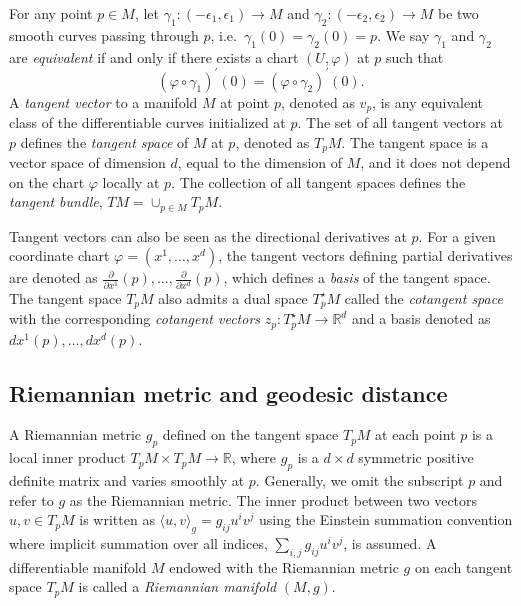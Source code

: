 \documentclass[11pt,a4paper,]{article}
\begin{document}
For any point \(p \in M\), let \(\gamma_1: (-\epsilon_1, \epsilon_1)\rightarrow M\) and \(\gamma_2: (-\epsilon_2, \epsilon_2)\rightarrow M\) be two smooth curves passing through \(p\), i.e.~\(\gamma_1(0) = \gamma_2(0) = p\). We say \(\gamma_1\) and \(\gamma_2\) are \emph{equivalent} if and only if there exists a chart \((U,\varphi)\) at \(p\) such that
\[
(\varphi \circ \gamma_1)^\prime(0) = (\varphi \circ \gamma_2)^\prime(0).
\]
A \emph{tangent vector} to a manifold \(M\) at point \(p\), denoted as \(v_p\), is any equivalent class of the differentiable curves initialized at \(p\). The set of all tangent vectors at \(p\) defines the \emph{tangent space} of \(M\) at \(p\), denoted as \(T_pM\). The tangent space is a vector space of dimension \(d\), equal to the dimension of \(M\), and it does not depend on the chart \(\varphi\) locally at \(p\). The collection of all tangent spaces defines the \emph{tangent bundle}, \(TM = \cup_{p \in M}T_pM\).

Tangent vectors can also be seen as the directional derivatives at \(p\). For a given coordinate chart \(\varphi=(x^1,\dots,x^d)\), the tangent vectors defining partial
derivatives are denoted as \(\frac{\partial}{\partial x^1}(p),\dots,\frac{\partial}{\partial x^d}(p)\), which defines a \emph{basis} of the tangent space.
The tangent space \(T_pM\) also admits a dual space \(T^\star_pM\) called the \emph{cotangent space} with the corresponding \emph{cotangent vectors} \(z_p: T^\star_pM \rightarrow \mathbb{R}^d\) and a basis denoted as \(dx^1(p),\dots,dx^d(p)\).

\hypertarget{riemannian-metric-and-geodesic-distance}{%
\subsection{Riemannian metric and geodesic distance}\label{riemannian-metric-and-geodesic-distance}}

A Riemannian metric \(g_p\) defined on the tangent space \(T_pM\) at each point \(p\) is a local inner product \(T_pM \times T_pM \rightarrow \mathbb{R}\), where \(g_p\) is a \(d\times d\) symmetric positive definite matrix and varies smoothly at \(p\). Generally, we
omit the subscript \(p\) and refer to \(g\) as the Riemannian metric. The inner product between two vectors \(u, v \in T_pM\) is written as \(\langle u, v \rangle_g = g_{ij}u^iv^j\) using the Einstein summation convention where implicit summation over all indices, \(\sum_{i,j} g_{ij}u^iv^j\), is assumed. A differentiable manifold \(M\) endowed with the Riemannian metric \(g\) on each tangent space \(T_pM\) is called a \emph{Riemannian manifold} \((M,g)\).
\end{document}
